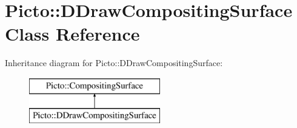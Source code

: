 \hypertarget{class_picto_1_1_d_draw_compositing_surface}{\section{Picto\-:\-:D\-Draw\-Compositing\-Surface Class Reference}
\label{class_picto_1_1_d_draw_compositing_surface}
}
Inheritance diagram for Picto\-:\-:D\-Draw\-Compositing\-Surface\-:\begin{figure}[H]
\begin{center}
\leavevmode
\includegraphics[height=2.000000cm]{class_picto_1_1_d_draw_compositing_surface}
\end{center}
\end{figure}
